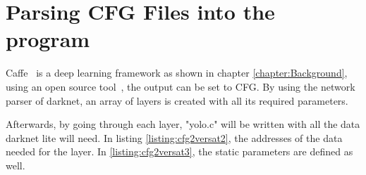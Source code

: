 



\section{Parsing CFG Files into the program}

Caffe~\cite{caffe} is a deep learning framework as shown in chapter \ref{chapter:Background},
using an open source tool~\cite{caffe2darknet}, the output can be set to CFG.
By using the network parser of darknet, an array of layers is created with all
its required parameters. 



Afterwards, by going through each layer, "yolo.c" will be written
with all the data darknet lite will need. 
In listing \ref{listing:cfg2versat2}, the addresses of the data needed for the layer. 
In \ref{listing:cfg2versat3}, the static parameters are defined as well.

\newpage



